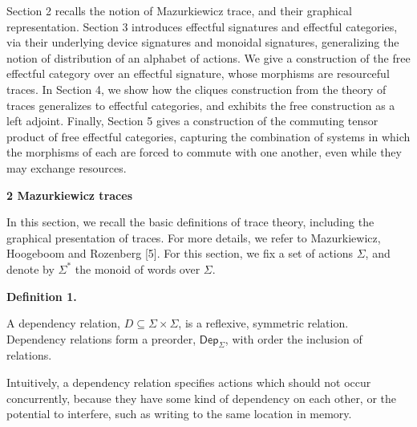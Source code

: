 Section 2 recalls the notion of Mazurkiewicz trace, and their graphical representation. Section 3 introduces effectful signatures and effectful categories, via their underlying device signatures and monoidal signatures, generalizing the notion of distribution of an alphabet of actions. We give a construction of the free effectful category over an effectful signature, whose morphisms are resourceful traces. In Section 4, we show how the cliques construction from the theory of traces generalizes to effectful categories, and exhibits the free construction as a left adjoint. Finally, Section 5 gives a construction of the commuting tensor product of free effectful categories, capturing the combination of systems in which the morphisms of each are forced to commute with one another, even while they may exchange resources.\par
 
 
 


 
\par\medskip\noindent\textbf{2 Mazurkiewicz traces}\par
 
 
In this section, we recall the basic definitions of trace theory, including the graphical presentation of traces. For more details, we refer to Mazurkiewicz, Hoogeboom and Rozenberg [5]. For this section, we fix a set of actions $\Sigma$, and denote by $\Sigma^{*}$ the monoid of words over $\Sigma$.\par
 
 
 
\par\medskip\noindent\textbf{Definition 1.}\par
 
 
A dependency relation, $D\subseteq\Sigma\times\Sigma$, is a reflexive, symmetric relation. Dependency relations form a preorder, $\mathsf{Dep}_{\Sigma}$, with order the inclusion of relations.\par
 
 
 
 
Intuitively, a dependency relation specifies actions which should not occur concurrently, because they have some kind of dependency on each other, or the potential to interfere, such as writing to the same location in memory.\par
 
